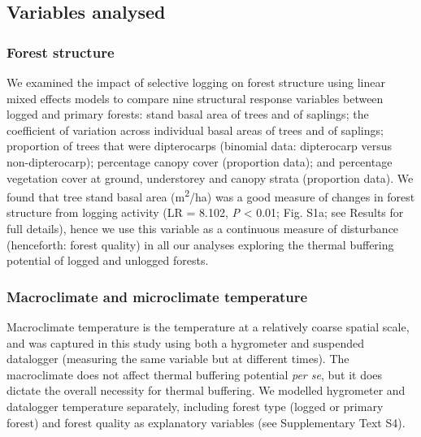 \documentclass[12pt,a4paper,]{report}
\theoremstyle{definition}
\theoremstyle{definition}
\theoremstyle{definition}
\theoremstyle{remark}
\begin{document}
\subsection{Variables analysed}\label{variables-analysed}

\subsubsection*{Forest structure}\label{forest-structure-1}

We examined the impact of selective logging on forest structure using
linear mixed effects models to compare nine structural response
variables between logged and primary forests: stand basal area of trees
and of saplings; the coefficient of variation across individual basal
areas of trees and of saplings; proportion of trees that were
dipterocarps (binomial data: dipterocarp versus non-dipterocarp);
percentage canopy cover (proportion data); and percentage vegetation
cover at ground, understorey and canopy strata (proportion data). We
found that tree stand basal area (m\textsuperscript{2}/ha) was a good
measure of changes in forest structure from logging activity (LR =
8.102, \emph{P} \textless{} 0.01; Fig. S1a; see Results for full
details), hence we use this variable as a continuous measure of
disturbance (henceforth: forest quality) in all our analyses exploring
the thermal buffering potential of logged and unlogged forests.

\subsubsection*{Macroclimate and microclimate
temperature}\label{macroclimate-and-microclimate-temperature}

Macroclimate temperature is the temperature at a relatively coarse
spatial scale, and was captured in this study using both a hygrometer
and suspended datalogger (measuring the same variable but at different
times). The macroclimate does not affect thermal buffering potential
\emph{per se}, but it does dictate the overall necessity for thermal
buffering. We modelled hygrometer and datalogger temperature separately,
including forest type (logged or primary forest) and forest quality as
explanatory variables (see Supplementary Text S4).
\end{document}
